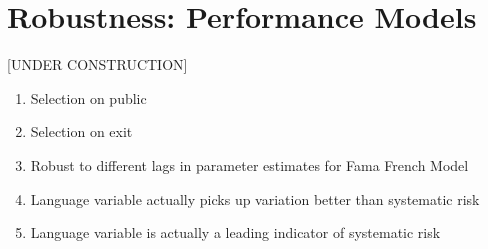 \chapter{Robustness: Performance Models\label{apndxB}}

[UNDER CONSTRUCTION]

\begin{enumerate}
  \item Selection on public
  \item Selection on exit
  \item Robust to different lags in parameter estimates for Fama French Model
  \item Language variable actually picks up variation better than systematic risk
  \item Language variable is actually a leading indicator of systematic risk
\end{enumerate}

